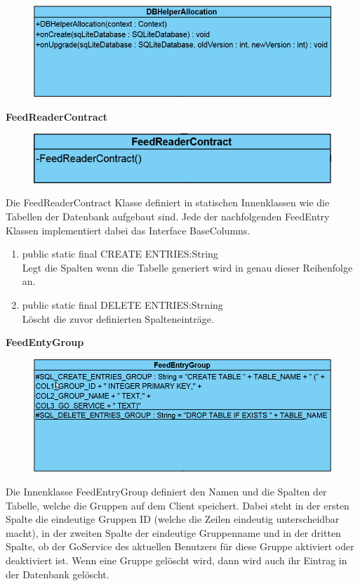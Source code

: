 \begin{figure}[H]
	\includegraphics[scale = .5]{res/umlClasses/DBHelperAllocation.png}
	\centering
\end{figure}


\textbf{FeedReaderContract}
\begin{figure}[H]
	\includegraphics[scale = .5]{res/umlClasses/FeedReaderContract.png}
	\centering
\end{figure}
Die FeedReaderContract Klasse definiert in statischen Innenklassen wie die Tabellen der Datenbank aufgebaut sind. Jede der nachfolgenden FeedEntry Klassen implementiert dabei das Interface BaseColumns.

\begin{enumerate}
	\item public static final CREATE ENTRIES:String\\
		Legt die Spalten wenn die Tabelle generiert wird in genau dieser Reihenfolge an.
	\item public static final DELETE ENTRIES:Strning\\
		Löscht die zuvor definierten Spalteneinträge.
\end{enumerate}

\textbf{FeedEntyGroup}
\begin{figure}[H]
	\includegraphics[scale = .5]{res/umlClasses/FeedEntryGroup.png}
	\centering
\end{figure}
Die Innenklasse FeedEntryGroup definiert den Namen und die Spalten der Tabelle, welche die Gruppen auf dem Client speichert. 
Dabei steht in der ersten Spalte die eindeutige Gruppen ID (welche die Zeilen eindeutig unterscheidbar macht), in der zweiten Spalte der eindeutige Gruppenname und in der dritten Spalte, ob der GoService des aktuellen Benutzers für diese Gruppe aktiviert oder deaktiviert ist.
Wenn eine Gruppe gelöscht wird, dann wird auch ihr Eintrag in der Datenbank gelöscht.

